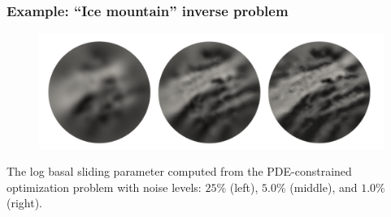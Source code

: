 \documentclass[10pt,final,xcolor=dvipsnames,aspect ratio=169]{beamer}
\begin{document}
\begin{frame}
	\frametitle{Example: ``Ice mountain'' inverse problem}
	
	\begin{figure}
		\centering\includegraphics[scale=0.6]{extraplots/reconstructions-ice.png}
	\end{figure}
	\begin{center}
		The log basal sliding parameter computed from the PDE-constrained
		optimization problem with noise levels: $25\%$ (left), $5.0\%$
		(middle), and $1.0\%$ (right).
	\end{center}
\end{frame}
\end{document}
